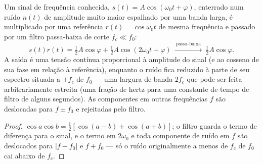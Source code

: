 \begin{proposition}\label{prop:b2:feedback-oscillators:lockin}
Um sinal de frequência conhecida, $s(t) = A\cos(\omega_0t + \varphi)$, enterrado num
ruído $n(t)$ de amplitude muito maior espalhado por uma banda larga, é
multiplicado por uma referência $r(t) = \cos\omega_0t$ de mesma frequência
e passado por um filtro passa-baixa de corte $f_c \ll f_0$:
\[
s(t)r(t) = \tfrac12A\cos\varphi + \tfrac12A\cos(2\omega_0t + \varphi)
\ \xrightarrow{\ \text{passa-baixa}\ }\ \tfrac12A\cos\varphi .
\]
A saída é uma tensão contínua proporcional à amplitude do sinal (e
ao cosseno de sua fase em relação à referência), enquanto o ruído
fica reduzido à parte de seu espectro situada a $\pm f_c$ de $f_0$
--- uma largura de banda $2f_c$ que pode ser feita arbitrariamente estreita (uma fração
de hertz para uma constante de tempo de filtro de alguns segundos). As componentes em outras
frequências $f$ são deslocadas para $f \pm f_0$ e rejeitadas pelo filtro.
\end{proposition}

\begin{proof}
$\cos a\cos b = \tfrac12[\cos(a - b) + \cos(a + b)]$; o filtro guarda o
termo de diferença para o sinal, e o termo em $2\omega_0$ e toda componente de ruído
em $f$ são deslocados para $|f - f_0|$ e $f + f_0$ --- só o
ruído originalmente a menos de $f_c$ de $f_0$ cai abaixo de $f_c$.
\end{proof}

